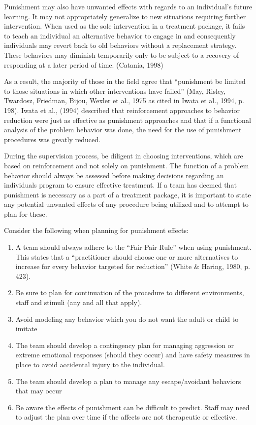 Punishment may also have unwanted effects with regards to an individual's future learning.  It may not appropriately generalize to new situations requiring further intervention. When used as the sole intervention in a treatment package, it fails to teach an individual an alternative behavior to engage in and consequently individuals may revert back to old behaviors without a replacement strategy. These behaviors may diminish temporarily only to be subject to a recovery of responding at a later period of time. (Catania, 1998)

As a result, the majority of those in the field agree that ``punishment be limited to those situations in which other interventions have failed'' (May, Risley, Twardosz, Friedman, Bijou, Wexler et al., 1975 as cited in Iwata et al., 1994, p. 198).  Iwata et al., (1994) described that reinforcement approaches to behavior reduction were just as effective as punishment approaches and that if a functional analysis of the problem behavior was done, the need for the use of punishment procedures was greatly reduced.  

During the supervision process, be diligent in choosing interventions, which are based on reinforcement and not solely on punishment.  The function of a problem behavior should always be assessed before making decisions regarding an individuals program to ensure effective treatment.  If a team has deemed that punishment is necessary as a part of a treatment package, it is important to state any potential unwanted effects of any procedure being utilized and to attempt to plan for these.

Consider the following when planning for punishment effects:
\begin{enumerate}
\item A team should always adhere to the ``Fair Pair Rule'' when using punishment.  This states that a ``practitioner should choose one or more alternatives to increase for every behavior targeted for reduction'' (White \& Haring, 1980, p. 423).
\item Be sure to plan for continuation of the procedure to different environments, staff and stimuli (any and all that apply).
\item Avoid modeling any behavior which you do not want the adult or child to imitate
\item The team should develop a contingency plan for managing aggression or extreme emotional responses (should they occur) and have safety measures in place to avoid accidental injury to the individual.
\item The team should develop a plan to manage any escape/avoidant behaviors that may occur 
\item Be aware the effects of punishment can be difficult to predict.  Staff may need to adjust the plan over time if the affects are not therapeutic or effective.  
\end{enumerate}
%
